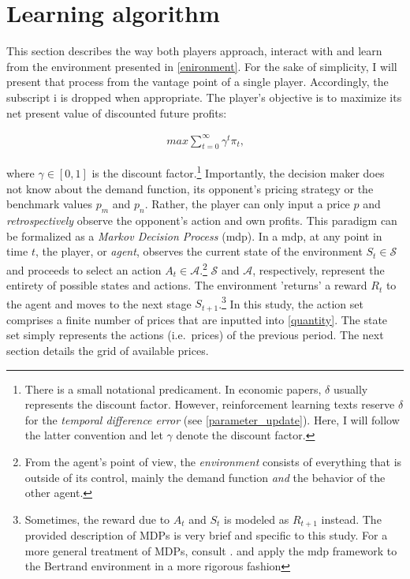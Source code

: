 \section{Learning algorithm}\label{algorithm}

This section describes the way both players approach, interact with and learn from the environment presented in \autoref{enironment}. For the sake of simplicity, I will present that process from the vantage point of a single player. Accordingly, the subscript {i} is dropped when appropriate. The player's objective is to maximize its net present value of discounted future profits:

\begin{gather}\label{maximization}
max \sum_{t = 0}^{\infty} \gamma^t \pi_{t} \text{,}
\end{gather}

where $\gamma \in [0, 1]$ is the discount factor.\footnote{There is a small notational predicament. In economic papers, $\delta$ usually represents the discount factor. However, reinforcement learning texts reserve $\delta$ for the \emph{temporal difference error} (see \autoref{parameter_update}). Here, I will follow the latter convention and let $\gamma$ denote the discount factor.} Importantly, the decision maker does not know about the demand function, its opponent's pricing strategy or the benchmark values $p_m$ and $p_n$. Rather, the player can only input a price $p$ and \emph{retrospectively} observe the opponent's action and own profits. This paradigm can be formalized as a \emph{Markov Decision Process} (\gls{mdp}). In a \gls{mdp}, at any point in time $t$, the player, or \emph{agent}, observes the current state of the environment $S_t \in \mathcal{S}$ and proceeds to select an action $A_t \in \mathcal{A}$.\footnote{From the agent's point of view, the \emph{environment} consists of everything that is outside of its control, mainly the demand function \emph{and} the behavior of the other agent.} $\mathcal{S}$ and $\mathcal{A}$, respectively, represent the entirety of possible states and actions. The environment 'returns' a reward $R_t$ to the agent and moves to the next stage $S_{t+1}$.\footnote{Sometimes, the reward due to $A_t$ and $S_t$ is modeled as $R_{t+1}$ instead. The provided description of MDPs is very brief and specific to this study. For a more general treatment of MDPs, consult \textcite{sutton_reinforcement_2018}. \textcite{calvano_artificial_2020} and \textcite{hettich_algorithmic_2021} apply the \gls{mdp} framework to the Bertrand environment in a more rigorous fashion} In this study, the action set comprises a finite number of prices that are inputted into \autoref{quantity}. The state set simply represents the actions (i.e.\ prices) of the previous period. The next section details the grid of available prices.


